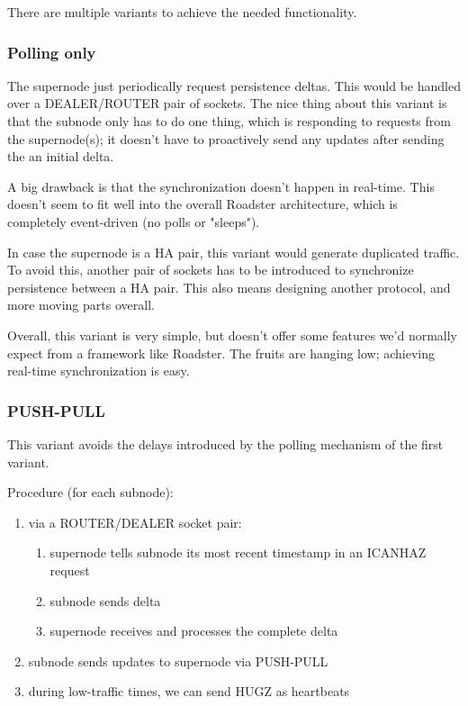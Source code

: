 There are multiple variants to achieve the needed functionality.

\subsubsection{Polling only}
The supernode just periodically request persistence
deltas. This would be handled over a DEALER/ROUTER pair of sockets. The nice
thing about this variant is that the subnode only has to do one thing, which is
responding to requests from the supernode(s); it doesn't have to proactively
send any updates after sending the an initial delta.

A big drawback is that the synchronization doesn't happen in real-time. This
doesn't seem to fit well into the overall Roadster architecture, which is
completely event-driven (no polls or "sleeps").

In case the supernode is a HA pair, this variant would generate duplicated
traffic. To avoid this, another pair of sockets has to be introduced to
synchronize persistence between a HA pair. This also means designing another
protocol, and more moving parts overall.

Overall, this variant is very simple, but doesn't offer some features we'd
normally expect from a framework like Roadster. The fruits are hanging low;
achieving real-time synchronization is easy.

\subsubsection{PUSH-PULL}
This variant avoids the delays introduced by the polling mechanism of the first variant.

Procedure (for each subnode):
\begin{enumerate}
	\item via a ROUTER/DEALER socket pair:
		\begin{enumerate}
			\item supernode tells subnode its most recent timestamp in an ICANHAZ request
			\item subnode sends delta
			\item supernode receives and processes the complete delta
		\end{enumerate}
	\item subnode sends updates to supernode via PUSH-PULL
	\item during low-traffic times, we can send HUGZ as heartbeats
\end{enumerate}

